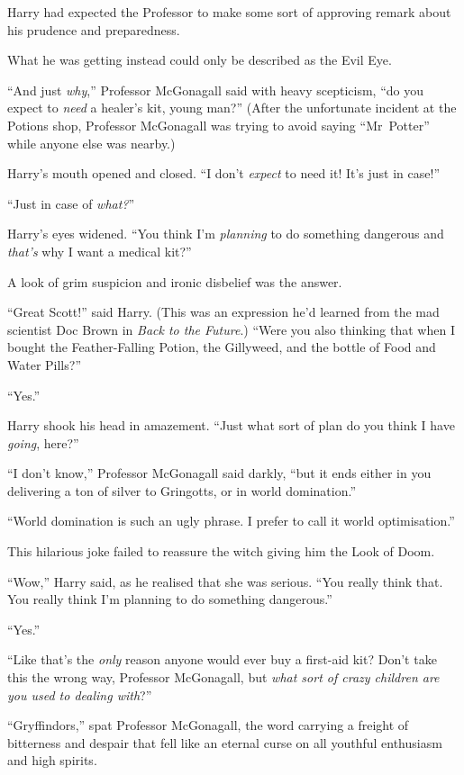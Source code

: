 Harry had expected the Professor to make some sort of approving remark about his prudence and preparedness.

What he was getting instead could only be described as the Evil Eye.

“And just \emph{why},” Professor McGonagall said with heavy scepticism, “do you expect to \emph{need} a healer’s kit, young man?” (After the unfortunate incident at the Potions shop, Professor McGonagall was trying to avoid saying “Mr~Potter” while anyone else was nearby.)

Harry’s mouth opened and closed. “I don’t \emph{expect} to need it! It’s just in case!”

“Just in case of \emph{what?}”

Harry’s eyes widened. “You think I’m \emph{planning} to do something dangerous and \emph{that’s} why I want a medical kit?”

A look of grim suspicion and ironic disbelief was the answer.

“Great Scott!” said Harry. (This was an expression he’d learned from the mad scientist Doc Brown in \emph{Back to the Future}.) “Were you also thinking that when I bought the Feather-Falling Potion, the Gillyweed, and the bottle of Food and Water Pills?”

“Yes.”

Harry shook his head in amazement. “Just what sort of plan do you think I have \emph{going}, here?”

“I don’t know,” Professor McGonagall said darkly, “but it ends either in you delivering a ton of silver to Gringotts, or in world domination.”

“World domination is such an ugly phrase. I prefer to call it world optimisation.”

This hilarious joke failed to reassure the witch giving him the Look of Doom.

“Wow,” Harry said, as he realised that she was serious. “You really think that. You really think I’m planning to do something dangerous.”

“Yes.”

“Like that’s the \emph{only} reason anyone would ever buy a first-aid kit? Don’t take this the wrong way, Professor McGonagall, but \emph{what sort of crazy children are you used to dealing with}?”

“Gryffindors,” spat Professor McGonagall, the word carrying a freight of bitterness and despair that fell like an eternal curse on all youthful enthusiasm and high spirits.

